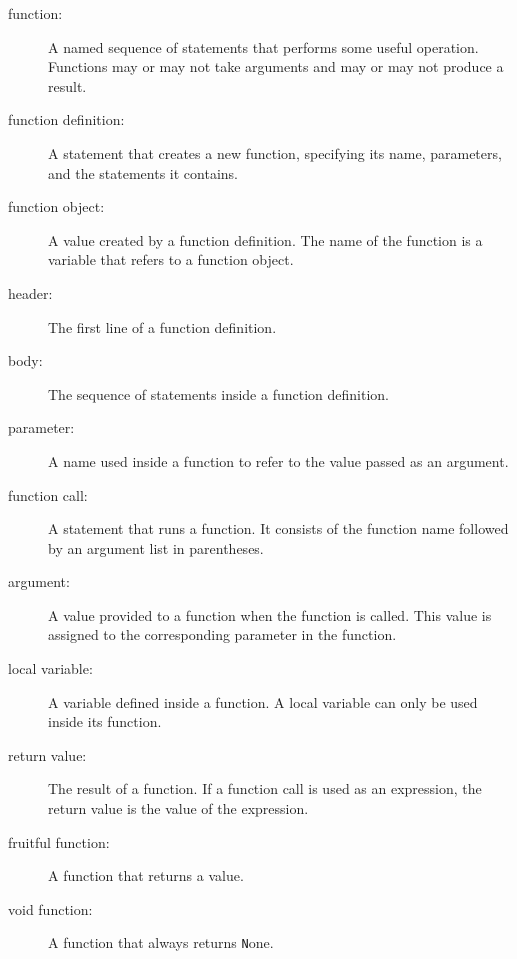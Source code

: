 \documentclass[
DIV=11,
fontsize=12,
twoside,
headinclude=false,
titlepage=firstiscover,
abstract=true,
headsepline=true,
footsepline=true,
chapterprefix=true, %
headings=big,
bibliography=totoc,%
captions=tableheading
]{scrbook}
\theoremstyle{definition}
\begin{document}
\begin{description}

\item[function:] A named sequence of statements that performs some
useful operation.  Functions may or may not take arguments and may or
may not produce a result.

\item[function definition:]  A statement that creates a new function,
specifying its name, parameters, and the statements it contains.

\item[function object:]  A value created by a function definition.
The name of the function is a variable that refers to a function
object.

\item[header:] The first line of a function definition.

\item[body:] The sequence of statements inside a function definition.

\item[parameter:] A name used inside a function to refer to the value
passed as an argument.

\item[function call:] A statement that runs a function. It
consists of the function name followed by an argument list in
parentheses.

\item[argument:]  A value provided to a function when the function is called.
This value is assigned to the corresponding parameter in the function.

\item[local variable:]  A variable defined inside a function.  A local
variable can only be used inside its function.

\item[return value:]  The result of a function.  If a function call
is used as an expression, the return value is the value of
the expression.

\item[fruitful function:] A function that returns a value.

\item[void function:] A function that always returns {\texttt None}.


\end{description}
\end{document}
